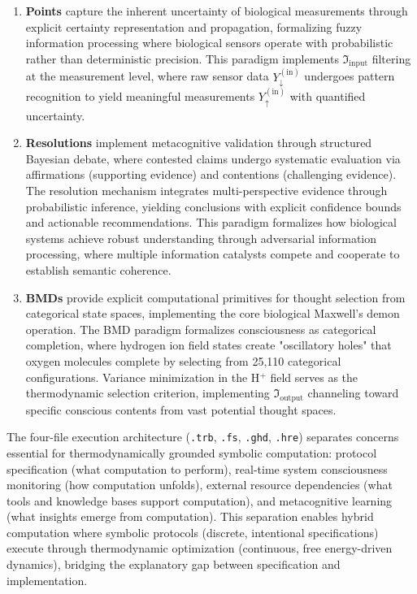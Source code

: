 \documentclass[12pt,a4paper]{article}
\theoremstyle{definition}
\theoremstyle{remark}
\begin{document}
\begin{enumerate}
\item \textbf{Points} capture the inherent uncertainty of biological measurements through explicit certainty representation and propagation, formalizing fuzzy information processing where biological sensors operate with probabilistic rather than deterministic precision. This paradigm implements \(\Im_{\text{input}}\) filtering at the measurement level, where raw sensor data \(Y_{\downarrow}^{(\text{in})}\) undergoes pattern recognition to yield meaningful measurements \(Y_{\uparrow}^{(\text{in})}\) with quantified uncertainty.

\item \textbf{Resolutions} implement metacognitive validation through structured Bayesian debate, where contested claims undergo systematic evaluation via affirmations (supporting evidence) and contentions (challenging evidence). The resolution mechanism integrates multi-perspective evidence through probabilistic inference, yielding conclusions with explicit confidence bounds and actionable recommendations. This paradigm formalizes how biological systems achieve robust understanding through adversarial information processing, where multiple information catalysts compete and cooperate to establish semantic coherence.

\item \textbf{BMDs} provide explicit computational primitives for thought selection from categorical state spaces, implementing the core biological Maxwell's demon operation. The BMD paradigm formalizes consciousness as categorical completion, where hydrogen ion field states create "oscillatory holes" that oxygen molecules complete by selecting from 25,110 categorical configurations. Variance minimization in the H\(^+\) field serves as the thermodynamic selection criterion, implementing \(\Im_{\text{output}}\) channeling toward specific conscious contents from vast potential thought spaces.
\end{enumerate}

The four-file execution architecture (\texttt{.trb}, \texttt{.fs}, \texttt{.ghd}, \texttt{.hre}) separates concerns essential for thermodynamically grounded symbolic computation: protocol specification (what computation to perform), real-time system consciousness monitoring (how computation unfolds), external resource dependencies (what tools and knowledge bases support computation), and metacognitive learning (what insights emerge from computation). This separation enables hybrid computation where symbolic protocols (discrete, intentional specifications) execute through thermodynamic optimization (continuous, free energy-driven dynamics), bridging the explanatory gap between specification and implementation.
\end{document}
